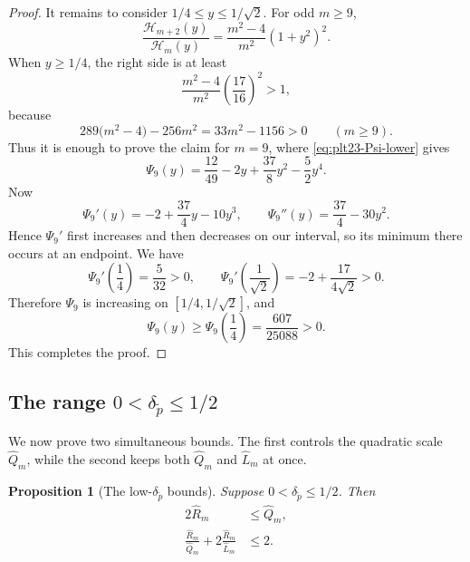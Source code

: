 ﻿\documentclass[11pt]{article}
\newtheorem{proposition}[theorem]{Proposition}
\numberwithin{equation}{section}
\begin{document}
\begin{proof}
  It remains to consider $1/4\le y\le1/\sqrt2$.
  For odd $m\ge9$,
  \[
    \frac{\mathcal H_{m+2}(y)}{\mathcal H_m(y)}
    =\frac{m^2-4}{m^2}(1+y^2)^2.
  \]
  When $y\ge1/4$, the right side is at least
  \[
    \frac{m^2-4}{m^2}\left(\frac{17}{16}\right)^2>1,
  \]
  because
  \[
    289\bigl(m^2-4\bigr)-256m^2
    =33m^2-1156>0
    \qquad (m\ge9).
  \]
  Thus it is enough to prove the claim for $m=9$, where \eqref{eq:plt23-Psi-lower} gives
  \[
    \Psi_9(y)=\frac{12}{49}-2y+\frac{37}{8}y^2-\frac52y^4.
  \]
  Now
  \[
    \Psi_9'(y)=-2+\frac{37}{4}y-10y^3,
    \qquad
    \Psi_9''(y)=\frac{37}{4}-30y^2.
  \]
  Hence $\Psi_9'$ first increases and then decreases on our interval, so its minimum there occurs at an endpoint.
  We have
  \[
    \Psi_9'\left(\frac14\right)=\frac5{32}>0,
    \qquad
    \Psi_9'\left(\frac1{\sqrt2}\right)
    =-2+\frac{17}{4\sqrt2}>0.
  \]
  Therefore $\Psi_9$ is increasing on $[1/4,1/\sqrt2]$, and
  \[
    \Psi_9(y)\ge\Psi_9\left(\frac14\right)=\frac{607}{25088}>0.
  \]
  This completes the proof.
\end{proof}

\subsection{The range \texorpdfstring{$0<\delta_{\tilde p}\le1/2$}{0<delta\_p<=1/2}}

We now prove two simultaneous bounds.
The first controls the quadratic scale $\widehat Q_m$, while the second keeps both $\widehat Q_m$ and $\widehat L_m$ at once.

\begin{proposition}[The low-$\delta_{\tilde p}$ bounds]\label{prop:plt23-low-v}
  Suppose $0<\delta_{\tilde p}\le1/2$.
  Then
  \begin{align}
    2\widehat R_m&\le\widehat Q_m,
    \label{eq:plt23-low-v-A}\\
    \frac{\widehat R_m}{\widehat Q_m}+2\frac{\widehat R_m}{\widehat L_m}&\le2.
    \label{eq:plt23-low-v-both}
  \end{align}
\end{proposition}
\end{document}
